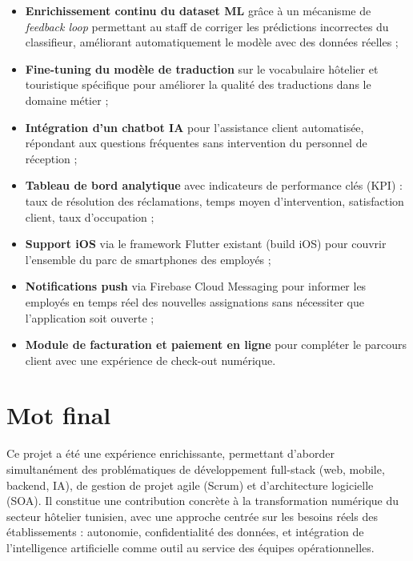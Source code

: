 \begin{itemize}
  \item \textbf{Enrichissement continu du dataset ML} grâce à un mécanisme de \textit{feedback loop} permettant au staff de corriger les prédictions incorrectes du classifieur, améliorant automatiquement le modèle avec des données réelles ;
  \item \textbf{Fine-tuning du modèle de traduction} sur le vocabulaire hôtelier et touristique spécifique pour améliorer la qualité des traductions dans le domaine métier ;
  \item \textbf{Intégration d'un chatbot IA} pour l'assistance client automatisée, répondant aux questions fréquentes sans intervention du personnel de réception ;
  \item \textbf{Tableau de bord analytique} avec indicateurs de performance clés (KPI) : taux de résolution des réclamations, temps moyen d'intervention, satisfaction client, taux d'occupation ;
  \item \textbf{Support iOS} via le framework Flutter existant (build iOS) pour couvrir l'ensemble du parc de smartphones des employés ;
  \item \textbf{Notifications push} via Firebase Cloud Messaging pour informer les employés en temps réel des nouvelles assignations sans nécessiter que l'application soit ouverte ;
  \item \textbf{Module de facturation et paiement en ligne} pour compléter le parcours client avec une expérience de check-out numérique.
\end{itemize}

\section*{Mot final}

Ce projet a été une expérience enrichissante, permettant d'aborder simultanément des problématiques de développement full-stack (web, mobile, backend, IA), de gestion de projet agile (Scrum) et d'architecture logicielle (SOA). Il constitue une contribution concrète à la transformation numérique du secteur hôtelier tunisien, avec une approche centrée sur les besoins réels des établissements : autonomie, confidentialité des données, et intégration de l'intelligence artificielle comme outil au service des équipes opérationnelles.
